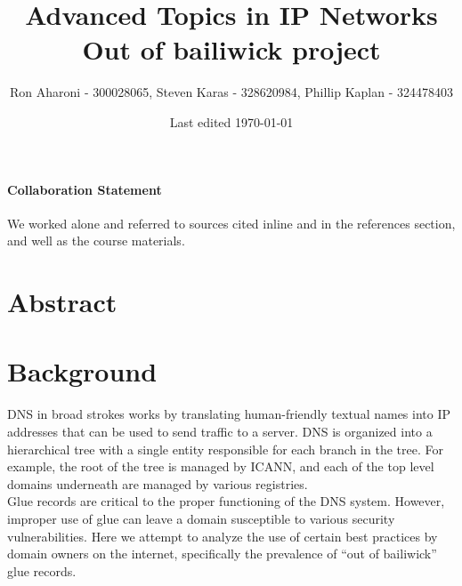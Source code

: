 \documentclass{idc_msc}
\title{Advanced Topics in IP Networks \\\large Out of bailiwick project}
\date{Last edited \today}
\author{Ron Aharoni\texorpdfstring{ - 300028065}{}, Steven Karas\texorpdfstring{ - 328620984}{}, Phillip Kaplan\texorpdfstring{ - 324478403}{}}
\begin{document}
\paragraph{Collaboration Statement}
  We worked alone and referred to sources cited inline and in the references section, and well as the course materials.


\section{Abstract}

\section{Background}


DNS in broad strokes works by translating human-friendly textual names into IP addresses that can be used to send traffic to a server.
DNS is organized into a hierarchical tree with a single entity responsible for each branch in the tree.
For example, the root of the tree is managed by ICANN, and each of the top level domains underneath are managed by various registries.\\
Glue records are critical to the proper functioning of the DNS system\cite{rfc1033}. However, improper use of glue can leave a domain susceptible to various security vulnerabilities. Here we attempt to analyze the use of certain best practices by domain owners on the internet, specifically the prevalence of “out of bailiwick” glue records.
\end{document}
